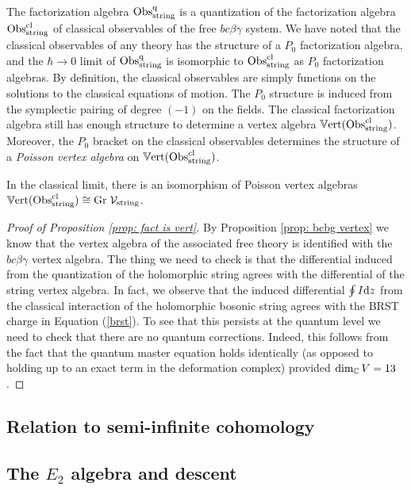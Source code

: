 The factorization algebra ${\rm Obs}^{\rm q}_{\rm string}$ is a quantization of the factorization algebra ${\rm Obs}^{{\rm cl}}_{\rm string}$ of classical observables of the free $bc\beta\gamma$ system.
We have noted that the classical observables of any theory has the structure of a $P_0$ factorization algebra, and the $\hbar \to 0$ limit of ${\rm Obs}^{\rm q}_{\rm string}$ is isomorphic to ${\rm Obs}^{{\rm cl}}_{\rm string}$ as $P_0$ factorization algebras.
By definition, the classical observables are simply functions on the solutions to the classical equations of motion.
The $P_0$ structure is induced from the symplectic pairing of degree $(-1)$ on the fields. 
The classical factorization algebra still has enough structure to determine a vertex algebra $\mathbb{V}{\rm ert}({\rm Obs}^{\rm cl}_{\rm string})$.
Moreover, the $P_0$ bracket on the classical observables determines the structure of a {\em Poisson vertex algebra} on $\mathbb{V}{\rm ert}({\rm Obs}^{{\rm cl}}_{\rm string})$. 

\begin{cor} In the classical limit, there is an isomorphism of Poisson vertex algebras~$\mathbb{V}{\rm ert}({\rm Obs}^{{\rm cl}}_{\rm string}) \cong {\rm Gr} \; \mathcal{V}_{\rm string}$.
\end{cor}

\begin{proof}[Proof of Proposition \ref{prop: fact is vert}] By Proposition \ref{prop: bcbg vertex} we know that the vertex algebra of the associated free theory is identified with the $bc\beta\gamma$ vertex algebra. 
The thing we need to check is that the differential induced from the quantization of the holomorphic string agrees with the differential of the string vertex algebra. 
In fact, we observe that the induced differential $\oint I {\rm d} z$ from the classical interaction of the holomorphic bosonic string agrees with the BRST charge in Equation (\ref{brst}). 
To see that this persists at the quantum level we need to check that there are no quantum corrections. 
Indeed, this follows from the fact that the quantum master equation holds identically (as opposed to holding up to an exact term in the deformation complex) provided $\dim_\mathbb C V = 13$. 
\end{proof}

\subsection{Relation to semi-infinite cohomology}


\subsection{The $E_2$ algebra and descent}

